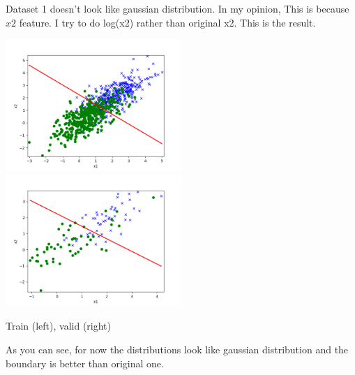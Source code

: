 \begin{answer}
Dataset 1 doesn't look like gaussian distribution. In my opinion, This is because $x2$ feature. I try to do log(x2) rather than original x2. This is the result.

\includegraphics[width=0.5\textwidth]{linearclass/gda_plot_1_log_train.png}
\includegraphics[width=0.5\textwidth]{linearclass/gda_plot_1_log_valid.png}

Train (left), valid (right)

As you can see, for now the distributions look like gaussian distribution and the boundary is better than original one.

\end{answer}
